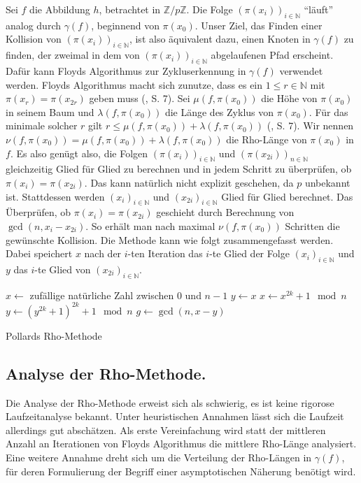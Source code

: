 \documentclass[a4paper, 11pt, ngerman]{article}
\newcommand{\N}{\mathbb{N}}
\newcommand{\Z}{\mathbb{Z}}
\theoremstyle{definition}
\theoremstyle{plain}
\theoremstyle{remark}
\begin{document}
Sei $f$ die Abbildung $h$, betrachtet in $\Z/p\Z$. Die Folge $(\pi(x_{i}))_{i \in \N}$ "`läuft"' analog durch $\gamma(f)$, beginnend von $\pi(x_0)$. Unser Ziel, das Finden einer Kollision von $(\pi(x_i))_{i \in \N}$, ist also äquivalent dazu, einen Knoten in $\gamma(f)$ zu finden, der zweimal in dem von $(\pi(x_i))_{i \in \N}$ abgelaufenen Pfad erscheint. Dafür kann Floyds Algorithmus zur Zykluserkennung in $\gamma(f)$ verwendet werden. Floyds Algorithmus macht sich zunutze, dass es ein $1 \le r \in \N$ mit $\pi(x_r) = \pi(x_{2r})$ geben muss (\cite{knu98}, S. 7). Sei $\mu(f, \pi(x_0))$ die Höhe von $\pi(x_0)$ in seinem Baum und $\lambda(f, \pi(x_0))$ die Länge des Zyklus von $\pi(x_0)$. Für das minimale solcher $r$ gilt $r \le \mu(f, \pi(x_0)) + \lambda(f, \pi(x_0))$ (\cite{knu98}, S. 7). Wir nennen $\nu(f, \pi(x_0)) = \mu(f, \pi(x_0)) + \lambda(f, \pi(x_0))$ die Rho-Länge von $\pi(x_0)$ in $f$. Es also genügt also, die Folgen $(\pi(x_i))_{i \in \N}$ und $(\pi(x_{2i}))_{n \in \N}$ gleichzeitig Glied für Glied zu berechnen und in jedem Schritt zu überprüfen, ob $\pi(x_i) = \pi(x_{2i})$. Das kann natürlich nicht explizit geschehen, da $p$ unbekannt ist. Stattdessen werden $(x_i)_{i \in \N}$ und $(x_{2i})_{i \in \N}$ Glied für Glied berechnet. Das Überprüfen, ob $\pi(x_i) = \pi(x_{2i})$ geschieht durch Berechnung von $\gcd(n, x_i - x_{2i})$. So erhält man nach maximal $\nu(f, \pi(x_0))$ Schritten die gewünschte Kollision. Die Methode kann wie folgt zusammengefasst werden. Dabei speichert $x$ nach der $i$-ten Iteration das $i$-te Glied der Folge $(x_i)_{i \in \N}$ und $y$ das $i$-te Glied von $(x_{2i})_{i \in \N}$.
\begin{algorithm}
    $x \gets $ zufällige natürliche Zahl zwischen $0$ und $n - 1$ \;
    $y \gets x$ \;
    {
        $x \gets x^{2k} + 1 \mod n$ \;
        $y \gets (y^{2k} + 1)^{2k} + 1 \mod n$ \;
        $g \gets \gcd(n, x - y)$ \;
        {
             \;
        }
    }

    \caption{Pollards Rho-Methode}
\end{algorithm}

\subsection{Analyse der Rho-Methode.}

Die Analyse der Rho-Methode erweist sich als schwierig, es ist keine rigorose Laufzeitanalyse bekannt. Unter heuristischen Annahmen lässt sich die Laufzeit allerdings gut abschätzen. Als erste Vereinfachung wird statt der mittleren Anzahl an Iterationen von Floyds Algorithmus die mittlere Rho-Länge analysiert. Eine weitere Annahme dreht sich um die Verteilung der Rho-Längen in $\gamma(f)$, für deren Formulierung der Begriff einer asymptotischen Näherung benötigt wird.
\end{document}
